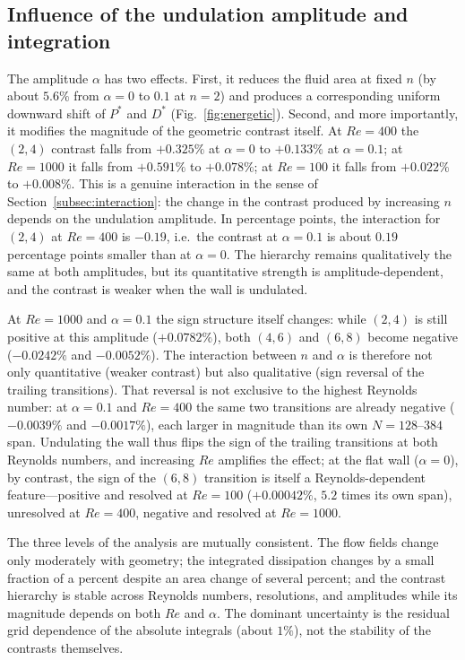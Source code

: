 \subsection{Influence of the undulation amplitude and integration}
\label{subsec:amplitude}

The amplitude $\alpha$ has two effects. First, it reduces the fluid area at fixed $n$ (by about $5.6\%$ from $\alpha=0$ to $0.1$ at $n=2$) and produces a corresponding uniform downward shift of $P^*$ and $D^*$ (Fig.~\ref{fig:energetic}). Second, and more importantly, it modifies the magnitude of the geometric contrast itself. At $Re=400$ the $(2,4)$ contrast falls from $+0.325\%$ at $\alpha=0$ to $+0.133\%$ at $\alpha=0.1$; at $Re=1000$ it falls from $+0.591\%$ to $+0.078\%$; at $Re=100$ it falls from $+0.022\%$ to $+0.008\%$. This is a genuine interaction in the sense of Section~\ref{subsec:interaction}: the change in the contrast produced by increasing $n$ depends on the undulation amplitude. In percentage points, the interaction for $(2,4)$ at $Re=400$ is $-0.19$, i.e.\ the contrast at $\alpha=0.1$ is about $0.19$ percentage points smaller than at $\alpha=0$. The hierarchy remains qualitatively the same at both amplitudes, but its quantitative strength is amplitude-dependent, and the contrast is weaker when the wall is undulated.

At $Re=1000$ and $\alpha=0.1$ the sign structure itself changes: while $(2,4)$ is still positive at this amplitude ($+0.0782\%$), both $(4,6)$ and $(6,8)$ become negative ($-0.0242\%$ and $-0.0052\%$). The interaction between $n$ and $\alpha$ is therefore not only quantitative (weaker contrast) but also qualitative (sign reversal of the trailing transitions). That reversal is not exclusive to the highest Reynolds number: at $\alpha=0.1$ and $Re=400$ the same two transitions are already negative ($-0.0039\%$ and $-0.0017\%$), each larger in magnitude than its own $N=128$--$384$ span. Undulating the wall thus flips the sign of the trailing transitions at both Reynolds numbers, and increasing $Re$ amplifies the effect; at the flat wall ($\alpha=0$), by contrast, the sign of the $(6,8)$ transition is itself a Reynolds-dependent feature---positive and resolved at $Re=100$ ($+0.00042\%$, $5.2$ times its own span), unresolved at $Re=400$, negative and resolved at $Re=1000$.

The three levels of the analysis are mutually consistent. The flow fields change only moderately with geometry; the integrated dissipation changes by a small fraction of a percent despite an area change of several percent; and the contrast hierarchy is stable across Reynolds numbers, resolutions, and amplitudes while its magnitude depends on both $Re$ and $\alpha$. The dominant uncertainty is the residual grid dependence of the absolute integrals (about $1\%$), not the stability of the contrasts themselves.

